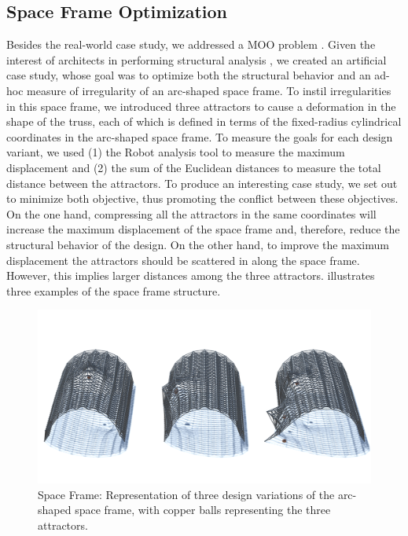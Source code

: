\subsection{Space Frame Optimization}

Besides the real-world case study, we addressed a \ac{MOO} problem \cite{Belem2019MOO}. Given the interest of architects in performing structural analysis \cite{Cichocka2017SURVEY}, we created an artificial case study, whose goal was to optimize both the structural behavior and an ad-hoc measure of irregularity of an arc-shaped space frame. To instil irregularities in this space frame, we introduced three attractors to cause a deformation in the shape of the truss, each of which is defined in terms of the fixed-radius cylindrical coordinates in the arc-shaped space frame. To measure the goals for each design variant, we used (1) the Robot analysis tool to measure the maximum displacement and (2) the sum of the Euclidean distances to measure the total distance between the attractors. To produce an interesting case study, we set out to minimize both objective, thus promoting the conflict between these objectives. On the one hand, compressing all the attractors in the same coordinates will increase the maximum displacement of the space frame and, therefore, reduce the structural behavior of the design. On the other hand,  to improve the maximum displacement the attractors should be scattered in along the space frame. However, this implies larger distances among the three attractors.  illustrates three examples of the space frame structure. 

\begin{figure}[htbp]
	\centering
	\includegraphics[width=1\textwidth]{Images/Evaluation/truss-kat.png}
	\caption[Space Frame: Representation of three space frame design variants]{Space Frame: Representation of three design variations of the arc-shaped space frame, with copper balls representing the three attractors.}
	\label{fig:spaceframe}
\end{figure}

